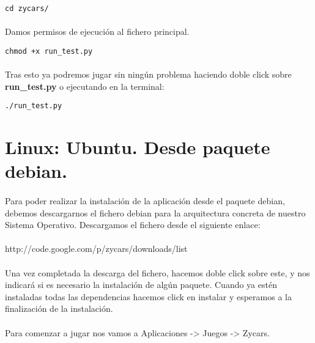 \begin{lstlisting}[style=consola, numbers=none]
cd zycars/
\end{lstlisting}

\paragraph{}
Damos permisos de ejecución al fichero principal.

\begin{lstlisting}[style=consola, numbers=none]
chmod +x run_test.py
\end{lstlisting}

\paragraph{}
Tras esto ya podremos jugar sin ningún problema haciendo doble click sobre \textbf{run\_test.py} o ejecutando en la terminal:
\begin{lstlisting}[style=consola, numbers=none]
./run_test.py
\end{lstlisting}


\section{Linux: Ubuntu. Desde paquete debian.}

\paragraph{}
Para poder realizar la instalación de la aplicación desde el paquete debian, debemos descargarnos el fichero debian para
la arquitectura concreta de nuestro Sistema Operativo. Descargamos el fichero desde el siguiente enlace:\\\\

http://code.google.com/p/zycars/downloads/list

\paragraph{}
Una vez completada la descarga del fichero, hacemos doble click sobre este, y nos indicará si es necesario la instalación 
de algún paquete. Cuando ya estén instaladas todas las dependencias hacemos click en instalar y esperamos a la finalización
de la instalación.

\paragraph{}
Para comenzar a jugar nos vamos a Aplicaciones -> Juegos -> Zycars.

